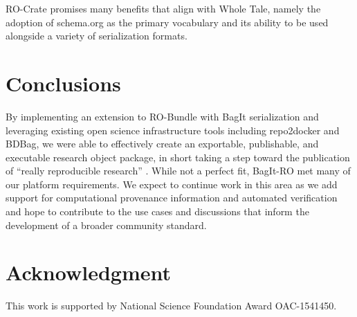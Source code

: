 \documentclass[conference]{IEEEtran}
\begin{document}
RO-Crate promises many benefits that align with Whole Tale, namely the adoption of schema.org as the primary vocabulary and its ability to be used alongside a variety of serialization formats. 

\section{Conclusions} \label{conclusion}
By implementing an extension to RO-Bundle with BagIt serialization and leveraging existing open science infrastructure tools including repo2docker and BDBag, we were able to effectively create an exportable, publishable, and executable research object package, in short taking a step toward the publication of ``really reproducible research'' \cite{claerbout1992}.  While not a perfect fit, BagIt-RO met many of our platform requirements. We expect to continue work in this area as we add support for computational provenance information and automated verification and hope to contribute to the use cases and discussions that inform the development of a broader community standard.

\section*{Acknowledgment}

This work is supported by National Science Foundation Award OAC-1541450. 





\newpage 
\end{document}
